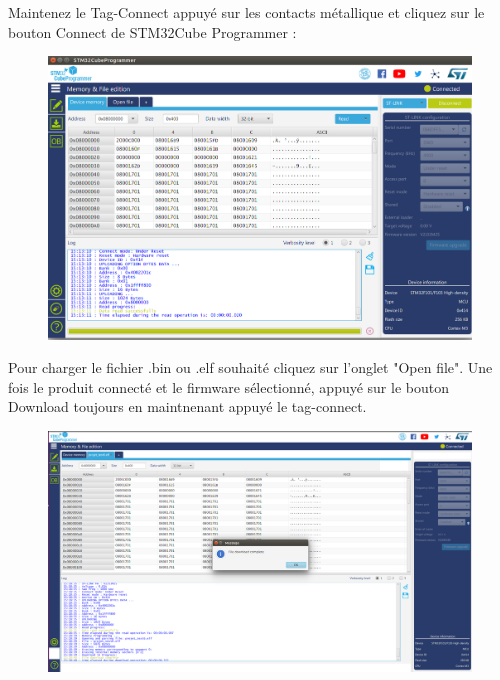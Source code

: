 \documentclass{article}
\begin{document}
Maintenez le Tag-Connect appuyé sur les contacts métallique et cliquez sur le bouton Connect de STM32Cube Programmer :
\begin{figure}[H]
\begin{center}
\advance\leftskip-3cm
\advance\rightskip-3cm
\includegraphics[keepaspectratio=true,scale=0.3]{connected.png}

\label{visina8}
\end{center}\end{figure}

Pour charger le fichier .bin ou .elf souhaité cliquez sur l'onglet "Open file".
Une fois le produit connecté et le firmware sélectionné, appuyé sur le bouton Download toujours en maintnenant appuyé le tag-connect.

\begin{figure}[H]
\begin{center}
\advance\leftskip-3cm
\advance\rightskip-3cm
\includegraphics[keepaspectratio=true,scale=0.3]{downloaded.png}

\label{visina8}
\end{center}\end{figure}
\end{document}
